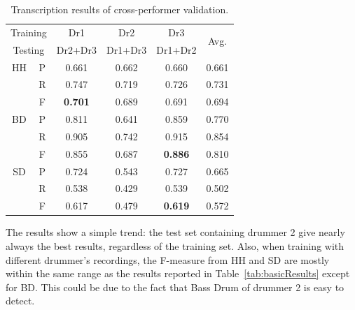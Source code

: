 \documentclass{article}
\newcommand{\tabref}[1]{\mbox{Table~\ref{#1}}}
\begin{document}
\begin{table}[ht]
\begin{footnotesize}
\begin{center}
\begin{tabular}{|c|c|c|c|c|c|}
\hline
\multicolumn{2}{|c|}{Training} & Dr1            & Dr2     & Dr3            & \multirow{2}{*}{Avg.} \\ \cline{1-5}
\multicolumn{2}{|c|}{Testing}  & Dr2+Dr3        & Dr1+Dr3 & Dr1+Dr2        &                       \\ \hline
HH             & P             & 0.661          & 0.662   & 0.660          & 0.661                 \\ \hline
               & R             & 0.747          & 0.719   & 0.726          & 0.731                 \\ \hline
               & F             & \textbf{0.701} & 0.689   & 0.691          & 0.694                 \\ \hline
BD             & P             & 0.811          & 0.641   & 0.859          & 0.770                 \\ \hline
               & R             & 0.905          & 0.742   & 0.915          & 0.854                 \\ \hline
               & F             & 0.855          & 0.687   & \textbf{0.886} & 0.810                 \\ \hline
SD             & P             & 0.724          & 0.543   & 0.727          & 0.665                 \\ \hline
               & R             & 0.538          & 0.429   & 0.539          & 0.502                 \\ \hline
               & F             & 0.617          & 0.479   & \textbf{0.619} & 0.572                 \\ \hline
\end{tabular}
 \caption{Transcription results of cross-performer validation.}
 \label{tab:crossResults}
 \end{center}
\end{footnotesize}
\end{table}

The results show a simple trend: the test set containing drummer 2 give nearly always the best results, regardless of the training set. Also, when training with different drummer's recordings, the F-measure from HH and SD are mostly within the same range as the results reported in \tabref{tab:basicResults} except for BD. This could be due to the fact that Bass Drum of drummer 2 is easy to detect.
\end{document}
